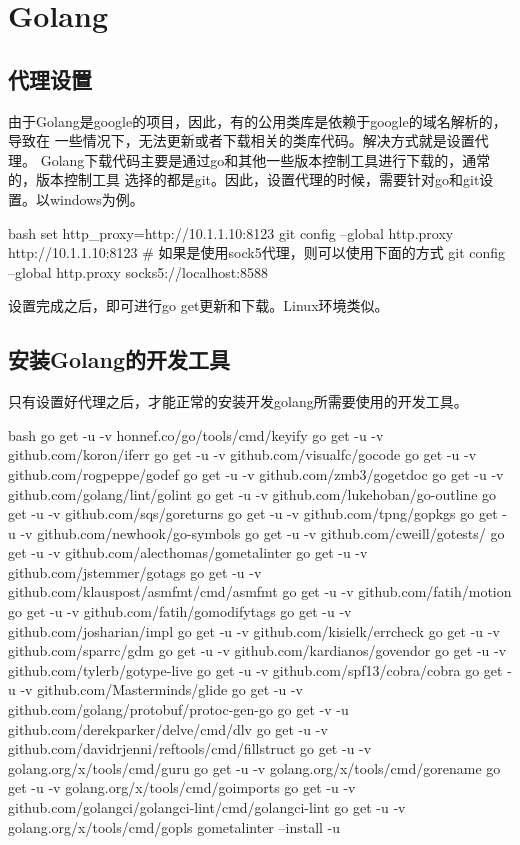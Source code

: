 \chapter{Golang}

\section{代理设置}
由于Golang是google的项目，因此，有的公用类库是依赖于google的域名解析的，导致在
一些情况下，无法更新或者下载相关的类库代码。解决方式就是设置代理。
Golang下载代码主要是通过go和其他一些版本控制工具进行下载的，通常的，版本控制工具
选择的都是git。因此，设置代理的时候，需要针对go和git设置。以windows为例。
\begin{code-block}{bash}
set http_proxy=http://10.1.1.10:8123
git config --global http.proxy http://10.1.1.10:8123
# 如果是使用sock5代理，则可以使用下面的方式
git config --global http.proxy socks5://localhost:8588
\end{code-block}

设置完成之后，即可进行go get更新和下载。Linux环境类似。

\section{安装Golang的开发工具}
只有设置好代理之后，才能正常的安装开发golang所需要使用的开发工具。
\begin{code-block}{bash}
go get -u -v honnef.co/go/tools/cmd/keyify
go get -u -v github.com/koron/iferr
go get -u -v github.com/visualfc/gocode
go get -u -v github.com/rogpeppe/godef
go get -u -v github.com/zmb3/gogetdoc
go get -u -v github.com/golang/lint/golint
go get -u -v github.com/lukehoban/go-outline
go get -u -v github.com/sqs/goreturns
go get -u -v github.com/tpng/gopkgs
go get -u -v github.com/newhook/go-symbols
go get -u -v github.com/cweill/gotests/
go get -u -v github.com/alecthomas/gometalinter
go get -u -v github.com/jstemmer/gotags
go get -u -v github.com/klauspost/asmfmt/cmd/asmfmt
go get -u -v github.com/fatih/motion
go get -u -v github.com/fatih/gomodifytags
go get -u -v github.com/josharian/impl
go get -u -v github.com/kisielk/errcheck
go get -u -v github.com/sparrc/gdm
go get -u -v github.com/kardianos/govendor
go get -u -v github.com/tylerb/gotype-live
go get -u -v github.com/spf13/cobra/cobra
go get -u -v github.com/Masterminds/glide
go get -u -v github.com/golang/protobuf/protoc-gen-go
go get -v -u github.com/derekparker/delve/cmd/dlv
go get -u -v github.com/davidrjenni/reftools/cmd/fillstruct
go get -u -v golang.org/x/tools/cmd/guru
go get -u -v golang.org/x/tools/cmd/gorename
go get -u -v golang.org/x/tools/cmd/goimports
go get -u -v github.com/golangci/golangci-lint/cmd/golangci-lint
go get -u -v golang.org/x/tools/cmd/gopls
gometalinter --install -u
\end{code-block}

